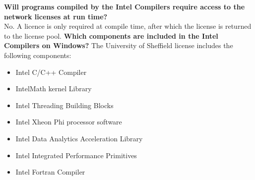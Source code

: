 \documentclass[10pt,a4paper,oneside]{article}
\begin{document}
\textbf{Will programs compiled by the Intel Compilers require access to the network licenses at run time?}\\
No. A licence is only required at compile time, after which the license is returned to the license pool.
\textbf{Which components are included in the Intel Compilers on Windows?}
The University of Sheffield license includes the following components:
\begin{itemize}
\item Intel C/C++ Compiler
\item IntelMath kernel Library
\item Intel Threading Building Blocks
\item Intel Xheon Phi processor software
\item Intel Data Analytics Acceleration Library 
\item Intel Integrated Performance Primitives
\item Intel Fortran Compiler
\end{itemize}
\end{document}
